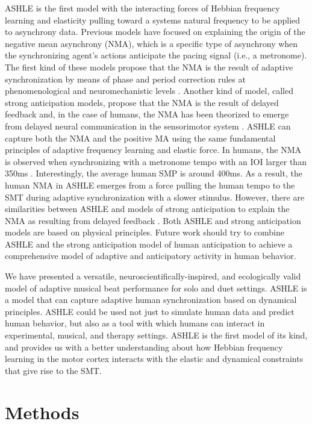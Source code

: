 \documentclass{report}
\begin{document}
ASHLE is the first model with the interacting forces of Hebbian frequency learning and elasticity pulling toward a systems natural frequency to be applied to asynchrony data. Previous models have focused on explaining the origin of the negative mean asynchrony (NMA), which is a specific type of asynchrony when the synchronizing agent's actions anticipate the pacing signal (i.e., a metronome). The first kind of these models propose that the NMA is the result of adaptive synchronization by means of phase and period correction rules at phenomenological \cite{van2013adaptation} and neuromechanistic levels \cite{bose2019neuromechanistic}. Another kind of model, called strong anticipation models, propose that the NMA is the result of delayed feedback \cite{stepp2010strong} and, in the case of humans, the NMA has been theorized to emerge from delayed neural communication in the sensorimotor system \cite{roman2019delayed}. ASHLE can capture both the NMA and the positive MA using the same fundamental principles of adaptive frequency learning and elastic force. In humans, the NMA is observed when synchronizing with a metronome tempo with an IOI larger than 350ms \cite{mates1994temporal}. Interestingly, the average human SMP is around 400ms. As a result, the human NMA in ASHLE emerges from a force pulling the human tempo to the SMT during adaptive synchronization with a slower stimulus. However, there are similarities between ASHLE and models of strong anticipation to explain the NMA as resulting from delayed feedback \cite{stepp2010strong, roman2019delayed}. Both ASHLE and strong anticipation models are based on physical principles. Future work should try to combine ASHLE and the strong anticipation model of human anticipation to achieve a comprehensive model of adaptive and anticipatory activity in human behavior.

We have presented a versatile, neuroscientifically-inspired, and ecologically valid model of adaptive musical beat performance for solo and duet settings. ASHLE is a model that can capture adaptive human synchronization based on dynamical principles. ASHLE could be used not just to simulate human data and predict human behavior, but also as a tool with which humans can interact in experimental, musical, and therapy settings. ASHLE is the first model of its kind, and provides us with a better understanding about how Hebbian frequency learning in the motor cortex interacts with the elastic and dynamical constraints that give rise to the SMT.

\section{Methods}
\end{document}
